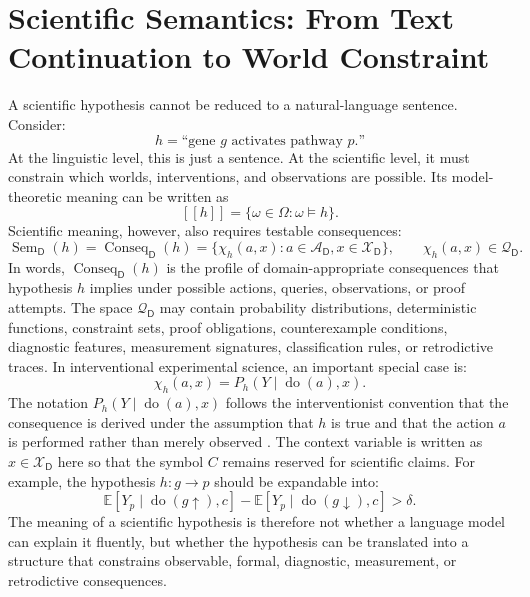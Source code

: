\documentclass[11pt,a4paper]{article}
\newcommand{\E}{\mathbb{E}}
\newcommand{\doop}{\operatorname{do}}
\newcommand{\Sem}{\operatorname{Sem}}
\newcommand{\Conseq}{\operatorname{Conseq}}
\newcommand{\denote}[1]{\left[\!\left[#1\right]\!\right]}
\newcommand{\Dom}{\mathsf{D}}
\begin{document}
\section{Scientific Semantics: From Text Continuation to World Constraint}

A scientific hypothesis cannot be reduced to a natural-language sentence. Consider:
\[
h=\text{``gene }g\text{ activates pathway }p\text{.''}
\]
At the linguistic level, this is just a sentence. At the scientific level, it must constrain which worlds, interventions, and observations are possible. Its model-theoretic meaning can be written as
\begin{equation}
  \denote{h}=\{\omega\in\Omega:\omega\models h\}.
\end{equation}
Scientific meaning, however, also requires testable consequences:
\begin{equation}
  \Sem_{\Dom}(h)=\Conseq_{\Dom}(h)
  =
  \{\chi_h(a,x):a\in\mathcal{A}_{\Dom},x\in\mathcal{X}_{\Dom}\},
  \qquad
  \chi_h(a,x)\in\mathcal{Q}_{\Dom}.
\end{equation}
In words, $\Conseq_{\Dom}(h)$ is the profile of domain-appropriate consequences that hypothesis $h$ implies under possible actions, queries, observations, or proof attempts. The space $\mathcal{Q}_{\Dom}$ may contain probability distributions, deterministic functions, constraint sets, proof obligations, counterexample conditions, diagnostic features, measurement signatures, classification rules, or retrodictive traces. In interventional experimental science, an important special case is:
\begin{equation}
  \chi_h(a,x)=P_h(Y\mid \doop(a),x).
\end{equation}
The notation $P_h(Y\mid \doop(a),x)$ follows the interventionist convention that the consequence is derived under the assumption that $h$ is true and that the action $a$ is performed rather than merely observed \citep{Pearl2009Causality}. The context variable is written as $x\in\mathcal{X}_{\Dom}$ here so that the symbol $C$ remains reserved for scientific claims.
For example, the hypothesis $h:g\rightarrow p$ should be expandable into:
\begin{equation}
\E[Y_p\mid \doop(g\uparrow),c]
-
\E[Y_p\mid \doop(g\downarrow),c]
>\delta.
\end{equation}
The meaning of a scientific hypothesis is therefore not whether a language model can explain it fluently, but whether the hypothesis can be translated into a structure that constrains observable, formal, diagnostic, measurement, or retrodictive consequences.
\end{document}

